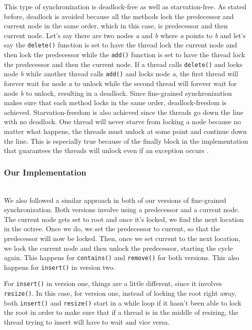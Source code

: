 \documentclass[conference]{IEEEtran}
\begin{document}
This type of synchronization is deadlock-free as well as starvation-free. As stated before, deadlock is avoided because all the methods lock the predecessor and current node in the same order, which in this case, is predecessor and then current node. Let’s say there are two nodes \textit{a} and \textit{b} where \textit{a} points to \textit{b} and let’s say the \verb|delete()| function is set to have the thread lock the current node and then lock the predecessor while the \verb|add()| function is set to have the thread lock the predecessor and then the current node. If a thread calls \verb|delete()| and locks node \textit{b} while another thread calls \verb|add()| and locks node \textit{a}, the first thread will forever wait for node \textit{a} to unlock while the second thread will forever wait for node \textit{b} to unlock, resulting in a deadlock. Since fine-grained synchronization makes sure that each method locks in the same order, deadlock-freedom is achieved. Starvation-freedom is also achieved since the threads go down the line with no deadlock. One thread will never starve from locking a node because no matter what happens, the threads must unlock at some point and continue down the line. This is especially true because of the finally block in the implementation that guarantees the threads will unlock even if an exception occurs \cite{textbook}.

\subsubsection{Our Implementation}~\\
\indent \indent We also followed a similar approach in both of our versions of fine-grained synchronization. Both versions involve using a predecessor and a current node. The current node gets set to root and once it's locked, we find the next location in the octree. Once we do, we set the predecessor to current, so that the predecessor will now be locked. Then, once we set current to the next location, we lock the current node and then unlock the predecessor, starting the cycle again. This happens for \verb|contains()| and \verb|remove()| for both versions. This also happens for \verb|insert()| in version two.

 \indent \indent For \verb|insert()| in version one, things are a little different, since it involves \verb|resize()|. In this case, for version one, instead of locking the root right away, both \verb|insert()| and \verb|resize()| start in a while loop if it hasn't been able to lock the root in order to make sure that if a thread is in the middle of resizing, the thread trying to insert will have to wait and vice versa.
\end{document}
